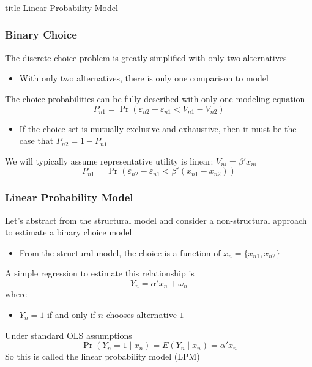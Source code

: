 \documentclass{beamer}\usepackage[]{graphicx}\usepackage[]{color}
\begin{document}
\begin{frame}\frametitle{}
    \vfill
    \centering
    \begin{beamercolorbox}[center]{title}
        \Large Linear Probability Model
    \end{beamercolorbox}
    \vfill
\end{frame}

\begin{frame}\frametitle{Binary Choice}
    The discrete choice problem is greatly simplified with only two alternatives
    \begin{itemize}
    	\item With only two alternatives, there is only one comparison to model
    \end{itemize}
    \vspace{2ex}
    The choice probabilities can be fully described with only one modeling equation 
    $$P_{n1} = \Pr(\varepsilon_{n2} - \varepsilon_{n1} < V_{n1} - V_{n2})$$
    \begin{itemize}
    	\item If the choice set is mutually exclusive and exhaustive, then it must be the case that $P_{n2} = 1 - P_{n1}$
    \end{itemize}
    \vspace{2ex}
    We will typically assume representative utility is linear: $V_{ni} = \beta' x_{ni}$
    $$P_{n1} = \Pr(\varepsilon_{n2} - \varepsilon_{n1} < \beta' (x_{n1} - x_{n2}))$$
\end{frame}

\begin{frame}\frametitle{Linear Probability Model}
    Let's abstract from the structural model and consider a non-structural approach to estimate a binary choice model
    \begin{itemize}
    	\item From the structural model, the choice is a function of $x_n = \{x_{n1}, x_{n2}\}$
    \end{itemize}
    \vspace{2ex}
    A simple regression to estimate this relationship is
    $$Y_n = \alpha' x_n + \omega_n$$
    where
    \begin{itemize}
    	\item $Y_n = 1$ if and only if $n$ chooses alternative $1$
    \end{itemize}
    \vspace{2ex}
    Under standard OLS assumptions
    $$\Pr(Y_n = 1 \mid x_n) = E(Y_n \mid x_n) = \alpha' x_n$$
    So this is called the linear probability model (LPM)
\end{frame}
\end{document}
